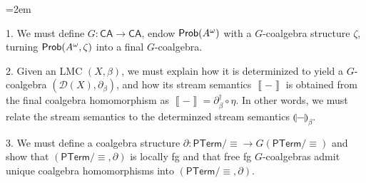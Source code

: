 \documentclass[11pt,a4paper]{amsart}
\begin{document}
\begin{list}{}{\leftmargin=2em}
\hypertarget{html:S4.I1.i1}{}
\item[]  1. %
\hypertarget{html:S4.I1.i1.p1}{} We must define %
\hypertarget{html:S4.I1.i1.p1.m1}{}\({G:\mathsf{CA}\to\mathsf{CA}}\), endow %
\hypertarget{html:S4.I1.i1.p1.m2}{}\({\text{\sf Prob}(A^{\omega})}\) with a %
\hypertarget{html:S4.I1.i1.p1.m3}{}\({G}\)-coalgebra structure %
\hypertarget{html:S4.I1.i1.p1.m4}{}\({\zeta}\), turning %
\hypertarget{html:S4.I1.i1.p1.m5}{}\({\text{\sf Prob}(A^{\omega},\zeta)}\) into a final %
\hypertarget{html:S4.I1.i1.p1.m6}{}\({G}\)-coalgebra.
\par\medskip
  
\hypertarget{html:S4.I1.i2}{}
\item[]  2. %
\hypertarget{html:S4.I1.i2.p1}{} Given an LMC %
\hypertarget{html:S4.I1.i2.p1.m1}{}\({(X,\beta)}\), we must explain how it is determinized to yield a %
\hypertarget{html:S4.I1.i2.p1.m2}{}\({G}\)-coalgebra %
\hypertarget{html:S4.I1.i2.p1.m3}{}\({(\mathcal{D}(X),\partial_{\beta})}\), and how its stream semantics %
\hypertarget{html:S4.I1.i2.p1.m4}{}\({\left\llbracket{-}\right\rrbracket}\) is obtained from the final coalgebra homomorphism as %
\hypertarget{html:S4.I1.i2.p1.m5}{}\({\left\llbracket{-}\right\rrbracket=\partial^{\dagger}_{\beta}\circ\eta}\). In other words, we must relate the stream semantics to the determinzed stream semantics %
\hypertarget{html:S4.I1.i2.p1.m6}{}\({\llparenthesis{-}\rrparenthesis_{\beta}}\).
\par\medskip
  
\hypertarget{html:S4.I1.i3}{}
\item[]  3. %
\hypertarget{html:S4.I1.i3.p1}{} We must define a coalgebra structure %
\hypertarget{html:S4.I1.i3.p1.m1}{}\({\partial:\mathsf{PTerm}/{\equiv}\to G(\mathsf{PTerm}/{\equiv})}\) and show that %
\hypertarget{html:S4.I1.i3.p1.m2}{}\({(\mathsf{PTerm}/{\equiv},\partial)}\) is locally fg and that free fg %
\hypertarget{html:S4.I1.i3.p1.m3}{}\({G}\)-coalgebras admit unique coalgebra homomorphisms into %
\hypertarget{html:S4.I1.i3.p1.m4}{}\({(\mathsf{PTerm}/{\equiv},\partial)}\).
\par\medskip
  

\end{list}
\end{document}
